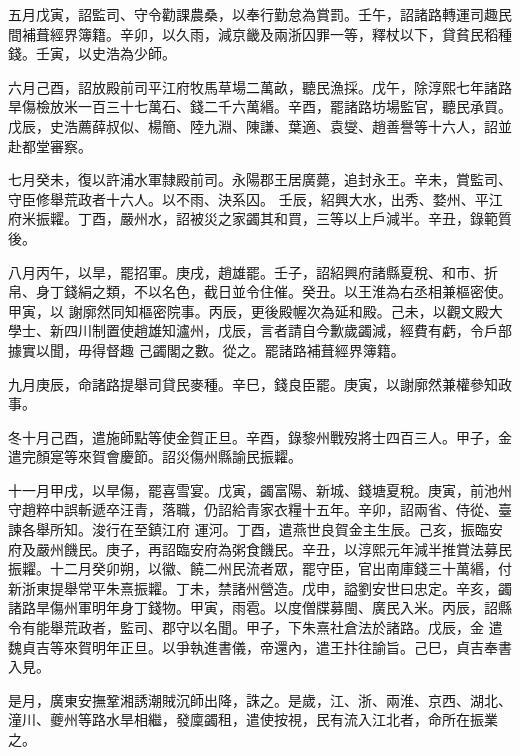 \begin{pinyinscope}
 五月戊寅，詔監司、守令勸課農桑，以奉行勤怠為賞罰。壬午，詔諸路轉運司趣民間補葺經界簿籍。辛卯，以久雨，減京畿及兩浙囚罪一等，釋杖以下，貸貧民稻種錢。壬寅，以史浩為少師。



 六月己酉，詔放殿前司平江府牧馬草場二萬畝，聽民漁採。戊午，除淳熙七年諸路旱傷檢放米一百三十七萬石、錢二千六萬緡。辛酉，罷諸路坊場監官，聽民承買。戊辰，史浩薦薛叔似、楊簡、陸九淵、陳謙、葉適、袁燮、趙善譽等十六人，詔並赴都堂審察。



 七月癸未，復以許浦水軍隸殿前司。永陽郡王居廣薨，追封永王。辛未，賞監司、守臣修舉荒政者十六人。以不雨、決系囚。
 壬辰，紹興大水，出秀、婺州、平江府米振糶。丁酉，嚴州水，詔被災之家蠲其和買，三等以上戶減半。辛丑，錄範質後。



 八月丙午，以旱，罷招軍。庚戌，趙雄罷。壬子，詔紹興府諸縣夏稅、和市、折帛、身丁錢絹之類，不以名色，截日並令住催。癸丑。以王淮為右丞相兼樞密使。甲寅，以
 謝廓然同知樞密院事。丙辰，更後殿幄次為延和殿。己未，以觀文殿大學士、新四川制置使趙雄知瀘州，戊辰，言者請自今歉歲蠲減，經費有虧，令戶部據實以聞，毋得督趣
 己蠲閣之數。從之。罷諸路補葺經界簿籍。



 九月庚辰，命諸路提舉司貸民麥種。辛巳，錢良臣罷。庚寅，以謝廓然兼權參知政事。



 冬十月己酉，遣施師點等使金賀正旦。辛酉，錄黎州戰歿將士四百三人。甲子，金遣完顏寔等來賀會慶節。詔災傷州縣諭民振糶。



 十一月甲戌，以旱傷，罷喜雪宴。戊寅，蠲富陽、新城、錢塘夏稅。庚寅，前池州守趙粹中誤斬遞卒汪青，落職，仍詔給青家衣糧十五年。辛卯，詔兩省、侍從、臺諫各舉所知。浚行在至鎮江府
 運河。丁酉，遣燕世良賀金主生辰。己亥，振臨安府及嚴州饑民。庚子，再詔臨安府為粥食饑民。辛丑，以淳熙元年減半推賞法募民振糶。十二月癸卯朔，以徽、饒二州民流者眾，罷守臣，官出南庫錢三十萬緡，付新浙東提舉常平朱熹振糶。丁未，禁諸州營造。戊申，謚劉安世曰忠定。辛亥，蠲諸路旱傷州軍明年身丁錢物。甲寅，雨雹。以度僧牒募閩、廣民入米。丙辰，詔縣令有能舉荒政者，監司、郡守以名聞。甲子，下朱熹社倉法於諸路。戊辰，金
 遣魏貞吉等來賀明年正旦。以爭執進書儀，帝還內，遣王抃往諭旨。己巳，貞吉奉書入見。



 是月，廣東安撫鞏湘誘潮賊沉師出降，誅之。是歲，江、浙、兩淮、京西、湖北、潼川、夔州等路水旱相繼，發廩蠲租，遣使按視，民有流入江北者，命所在振業之。




\end{pinyinscope}
